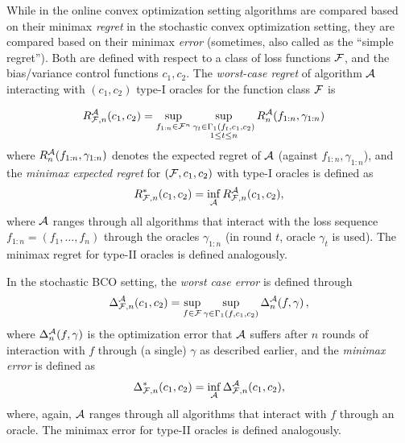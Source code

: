 While in the online convex optimization setting
algorithms are compared based on their minimax \emph{regret} 
 in the stochastic convex optimization setting, they are compared based on their
 minimax \emph{error}
 (sometimes, also called as the ``simple regret'').
Both are defined with respect to a class of loss functions $\mathcal{F}$, and the bias/variance control functions $c_1,c_2$.
The \emph{worst-case regret} of algorithm $\mathcal{A}$ interacting with $(c_1,c_2)$ type-I oracles for the function class $\mathcal{F}$ is

\begin{align*}
R_{\mathcal{F},n}^{\mathcal{A}}(c_1,c_2)
&=  \sup_{f_{1:n}\in \mathcal{F}^n}
	\sup_{\substack{\gamma_t \in \Gamma_1(f_t,c_1,c_2)\\1\le t \le n
	}} R_n^{\mathcal{A}}(f_{1:n},\gamma_{1:n})
\end{align*}
where $R_n^{\mathcal{A}}(f_{1:n},\gamma_{1:n})$ denotes the expected regret of $\mathcal{A}$ (against $f_{1:n},\gamma_{1:n}$), and
the \emph{minimax expected regret} for $(\mathcal{F},c_1,c_2)$ with type-I oracles is defined as
\[
R_{\mathcal{F},n}^*(c_1,c_2) = \inf_{\mathcal{A}} R_{\mathcal{F},n}^{\mathcal{A}}(c_1,c_2),
\]
where $\mathcal{A}$ ranges through all algorithms that interact with the loss sequence  $f_{1:n}= (f_1,\dots,f_n)$
through the oracles $\gamma_{1:n}$ (in round $t$, oracle $\gamma_t$ is used).
The minimax regret for type-II oracles is defined analogously.


In the stochastic BCO setting, the \emph{worst case error} is defined through
\begin{align}
\label{eq:minimaxerrdef}
\Delta_{\F,n}^\cA(c_1,c_2)
= \sup_{f \in \cF} \sup_{\gamma\in \Gamma_1(f,c_1,c_2)}  \Delta_n^{\cA}(f,\gamma)\,, %
\end{align}
where $\Delta_n^{\mathcal{A}}(f,\gamma)$ is the optimization error that $\mathcal{A}$ suffers
after $n$ rounds of interaction with $f$ through (a single) $\gamma$ as described earlier, and the \emph{minimax error}
is defined as
\[
\Delta_{\mathcal{F},n}^*(c_1,c_2) =  \inf_{\mathcal{A}} \Delta_{\mathcal{F},n}^{\mathcal{A}}(c_1,c_2),
\]
where, again, $\mathcal{A}$ ranges through all algorithms that interact with $f$ through an oracle.
The minimax error for type-II oracles is defined analogously.


